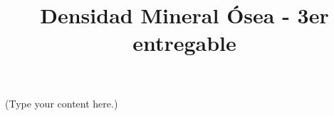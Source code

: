 \documentclass{article}
\title{Densidad Mineral Ósea - 3er entregable}
\date{}
\author{ }
\begin{document}
\maketitle

(Type your content here.)
\end{document}
